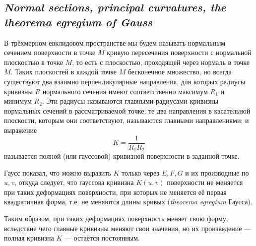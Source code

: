 \subsection*{ \textit{Normal sections, principal curvatures, the theorema egregium of Gauss}}
\begin{rusblock}
В трёхмерном евклидовом пространстве мы будем называть нормальным сечением поверхности в точке $M$ кривую пересечения поверхности с нормальной плоскостью в точке $M$, то есть с плоскостью, проходящей через нормаль в точке $M$. Таких плоскостей в каждой точке $M$ бесконечное множество, но всегда существуют два взаимно перпендикулярные направления, для которых радиусы кривизны $R$ нормального сечения имеют соответственно максимум $R_1$ и минимум $R_2$. Эти радиусы называются главными радиусами кривизны нормальных сечений в рассматриваемой точке; те два направления в касательной плоскости, которым они соответствуют, называются главными направлениями; и выражение
\[
K=\frac1{R_1R_2}
\]
называется полной (или гауссовой) кривизной поверхности в заданной точке.

Гаусс показал, что можно выразить $K$ только через $E,F,G$ и их производные по $u,v$, откуда следует, что гауссова кривизна $K(u,v)$ поверхности не меняется при таких деформациях поверхности, при которых не меняется её первая квадратичная форма, т.е. не меняются длины кривых (\emph{theorema egregium} Гаусса).

Таким образом, при таких деформациях поверхность меняет свою форму, вследствие чего главные кривизны меняют свои значения, но их произведение --- полная кривизна $K$ --- остаётся постоянным.
\end{rusblock}

